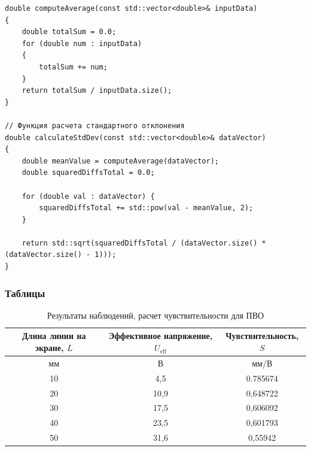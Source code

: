 \begin{lstlisting}[label=listing2, caption=Функция для вычисления среднего значения]
double computeAverage(const std::vector<double>& inputData) 
{
    double totalSum = 0.0;
    for (double num : inputData)
    {
        totalSum += num;
    }
    return totalSum / inputData.size();
}

// Функция расчета стандартного отклонения
double calculateStdDev(const std::vector<double>& dataVector) 
{
    double meanValue = computeAverage(dataVector);
    double squaredDiffsTotal = 0.0;

    for (double val : dataVector) {
        squaredDiffsTotal += std::pow(val - meanValue, 2);
    }

    return std::sqrt(squaredDiffsTotal / (dataVector.size() * (dataVector.size() - 1)));
}
\end{lstlisting}

\clearpage
\subsubsection{Таблицы}

\begin{center}
\begin{table}[h!]
\centering
\caption{Результаты наблюдений, расчет чувствительности для ПВО}
\label{tabl:1}
\begin{tabular}{|c|c|c|}
\hline
\begin{minipage}{5cm}
    Длина линии на экране, \( L \)
\end{minipage} &
\begin{minipage}{5cm}
    Эффективное напряжение, $U_{\text{eff}}$
\end{minipage} &
\begin{minipage}{5cm}
    Чувствительность, \( S \)
\end{minipage}\\
\hline
мм&В&мм/В\\
\hline
10 & 4,5 & 0.785674 \\
20 & 10,9 & 0,648722 \\
30 & 17,5 & 0,606092 \\
40 & 23,5 & 0,601793 \\
50 & 31,6 & 0,55942 \\
\hline
\end{tabular}
\end{table}
\end{center}

